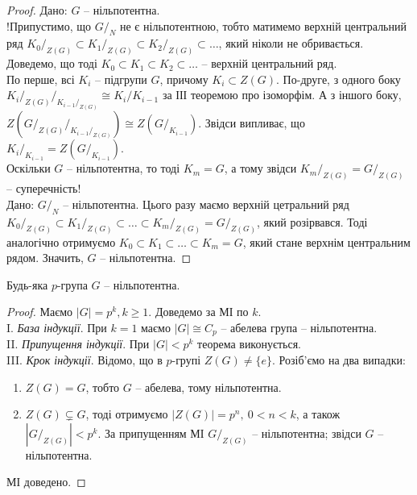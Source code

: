 \documentclass{math_library}
\begin{document}
\begin{proof}
\rightproof Дано: $G$ -- нільпотентна.\\
!Припустимо, що $G/_N$ не є нільпотентною, тобто матимемо верхній центральний ряд ${K_0}/_{Z(G)} \subset {K_1}/_{Z(G)} \subset {K_2}/_{Z(G)} \subset \dots$, який ніколи не обривається. Доведемо, що тоді $K_0 \subset K_1 \subset K_2 \subset \dots$ -- верхній центральний ряд.\\
По перше, всі $K_i$ -- підгрупи $G$, причому $K_i \subset Z(G)$. По-друге, з одного боку ${{K_i}/_{Z(G)}}/_{{K_{i-1}}/_{Z(G)}} \cong {K_i}/K_{i-1}$ за ІІІ теоремою про ізоморфім. А з іншого боку, $Z\left( {G/_{Z(G)}}/_{{K_{i-1}}/_{Z(G)}} \right) \cong Z(G/_{K_{i-1}})$. Звідси випливає, що ${K_i}/_{K_{i-1}} = Z(G/_{K_{i-1}})$.\\
Оскільки $G$ -- нільпотентна, то тоді $K_m = G$, а тому звідси ${K_m}/_{Z(G)} = G/_{Z(G)}$ -- суперечність!
\bigskip \\
\leftproof Дано: $G/_N$ -- нільпотентна. Цього разу маємо верхній цетральний ряд ${K_0}/_{Z(G)} \subset {K_1}/_{Z(G)} \subset \dots \subset {K_m}/_{Z(G)} = {G}/_{Z(G)}$, який розірвався. Тоді аналогічно отримуємо $K_0 \subset K_1 \subset \dots \subset K_m = G$, який стане верхнім центральним рядом. Значить, $G$ -- нільпотентна.
\end{proof}

\begin{theorem}
Будь-яка $p$-група $G$ -- нільпотентна.
\end{theorem}

\begin{proof}
Маємо $|G| = p^k, k \geq 1$. Доведемо за МІ по $k$.\\
I. \textit{База індукції}. При $k = 1$ маємо $|G| \cong C_p$ -- абелева група -- нільпотентна.\\
II. \textit{Припущення індукції}. При $|G| < p^k$ теорема виконується.\\
III. \textit{Крок індукції}. Відомо, що в $p$-групі $Z(G) \neq \{e\}$. Розіб'ємо на два випадки:
\begin{enumerate}[nosep,wide=0pt,label={\arabic*)}]
\item $Z(G) = G$, тобто $G$ -- абелева, тому нільпотентна.
\item $Z(G) \subsetneq G$, тоді отримуємо $|Z(G)| = p^n,\ 0 < n < k$, а також $|G/_{Z(G)}| < p^k$. За припущенням МІ $G/_{Z(G)}$ -- нільпотентна; звідси $G$ -- нільпотентна.
\end{enumerate}
МІ доведено.
\end{proof}
\newpage
\end{document}
